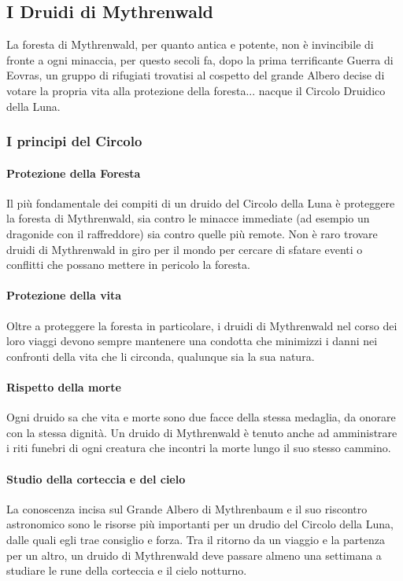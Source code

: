 \subsection{I Druidi di Mythrenwald}

La foresta di Mythrenwald, per quanto antica e potente, non è invincibile di fronte a ogni minaccia, per questo secoli fa, dopo la prima terrificante Guerra di Eovras, un gruppo di rifugiati trovatisi al cospetto del grande Albero decise di votare la propria vita alla protezione della foresta... nacque il Circolo Druidico della Luna.

\subsubsection{I principi del Circolo}

\paragraph{Protezione della Foresta} Il più fondamentale dei compiti di un druido del Circolo della Luna è proteggere la foresta di Mythrenwald, sia contro le minacce immediate (ad esempio un dragonide con il raffreddore) sia contro quelle più remote. Non è raro trovare druidi di Mythrenwald in giro per il mondo per cercare di sfatare eventi o conflitti che possano mettere in pericolo la foresta.

\paragraph{Protezione della vita} Oltre a proteggere la foresta in particolare, i druidi di Mythrenwald nel corso dei loro viaggi devono sempre mantenere una condotta che minimizzi i danni nei confronti della vita che li circonda, qualunque sia la sua natura.

\paragraph{Rispetto della morte} Ogni druido sa che vita e morte sono due facce della stessa medaglia, da onorare con la stessa dignità. Un druido di Mythrenwald è tenuto anche ad amministrare i riti funebri di ogni creatura che incontri la morte lungo il suo stesso cammino.

\paragraph{Studio della corteccia e del cielo} La conoscenza incisa sul Grande Albero di Mythrenbaum e il suo riscontro astronomico sono le risorse più importanti per un drudio del Circolo della Luna, dalle quali egli trae consiglio e forza. Tra il ritorno da un viaggio e la partenza per un altro, un druido di Mythrenwald deve passare almeno una settimana a studiare le rune della corteccia e il cielo notturno.

